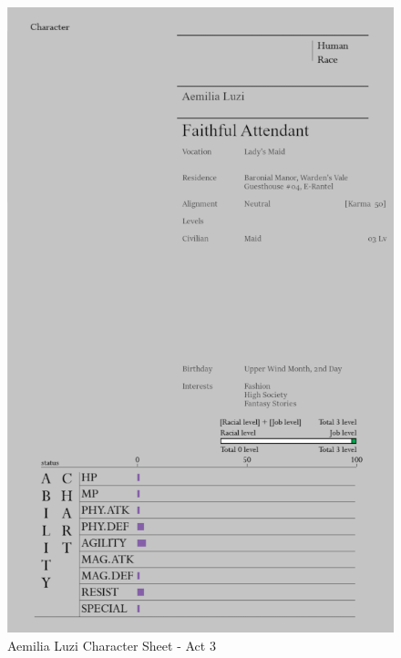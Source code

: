 \begin{figure}
    \centering
    \includegraphics[width=1\textwidth]{images/q0TuUBL.png}
    \caption*{Aemilia Luzi Character Sheet - Act 3}
\end{figure}

